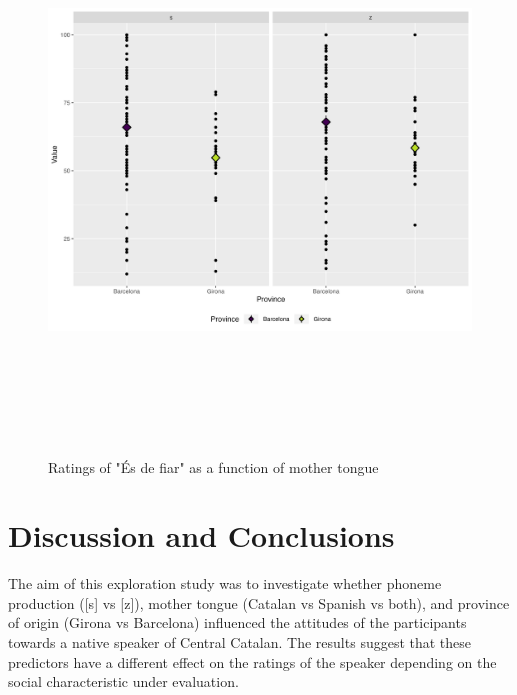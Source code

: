 \documentclass[
  a4paper,
  11pt,
  twocolumn]{article}
\begin{document}
\begin{figure}[!ht]
\begin{center}
\includegraphics[height=15cm]{./includes/figures/fiar.png}
\caption{Ratings of "És de fiar" as a function of mother tongue}\label{fig:fiar}
\end{center}
\end{figure}

\section{Discussion and Conclusions}

The aim of this exploration study was to investigate whether phoneme
production ({[}s{]} vs {[}z{]}), mother tongue (Catalan vs Spanish vs
both), and province of origin (Girona vs Barcelona) influenced the
attitudes of the participants towards a native speaker of Central
Catalan. The results suggest that these predictors have a different
effect on the ratings of the speaker depending on the social
characteristic under evaluation.
\end{document}
